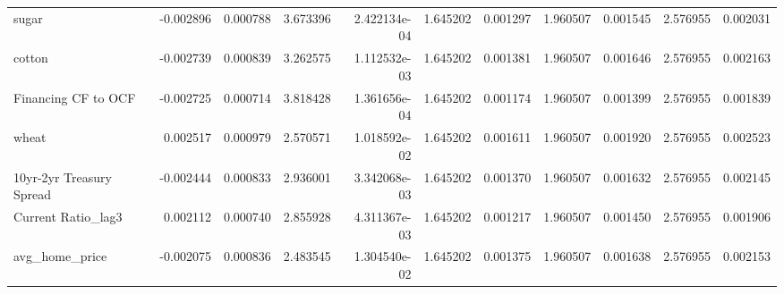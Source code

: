\documentclass[12pt,a4paper,english]{article}
\begin{document}
{{\begin{tabular}{@{}lrrrrrrrrrr@{}}
			sugar                          & -0.002896                & 0.000788                    & 3.673396                  & 2.422134e-04                             & 1.645202                      & 0.001297                      & 1.960507                     & 0.001545                     & 2.576955                     & 0.002031                     \\
			cotton                         & -0.002739                & 0.000839                    & 3.262575                  & 1.112532e-03                             & 1.645202                      & 0.001381                      & 1.960507                     & 0.001646                     & 2.576955                     & 0.002163                     \\
			Financing CF to OCF            & -0.002725                & 0.000714                    & 3.818428                  & 1.361656e-04                             & 1.645202                      & 0.001174                      & 1.960507                     & 0.001399                     & 2.576955                     & 0.001839                     \\
			wheat                          & 0.002517                 & 0.000979                    & 2.570571                  & 1.018592e-02                             & 1.645202                      & 0.001611                      & 1.960507                     & 0.001920                     & 2.576955                     & 0.002523                     \\
			10yr-2yr Treasury Spread       & -0.002444                & 0.000833                    & 2.936001                  & 3.342068e-03                             & 1.645202                      & 0.001370                      & 1.960507                     & 0.001632                     & 2.576955                     & 0.002145                     \\
			Current Ratio\_lag3            & 0.002112                 & 0.000740                    & 2.855928                  & 4.311367e-03                             & 1.645202                      & 0.001217                      & 1.960507                     & 0.001450                     & 2.576955                     & 0.001906                     \\
			avg\_home\_price               & -0.002075                & 0.000836                    & 2.483545                  & 1.304540e-02                             & 1.645202                      & 0.001375                      & 1.960507                     & 0.001638                     & 2.576955                     & 0.002153                     \\

\end{tabular}}}
\end{document}
